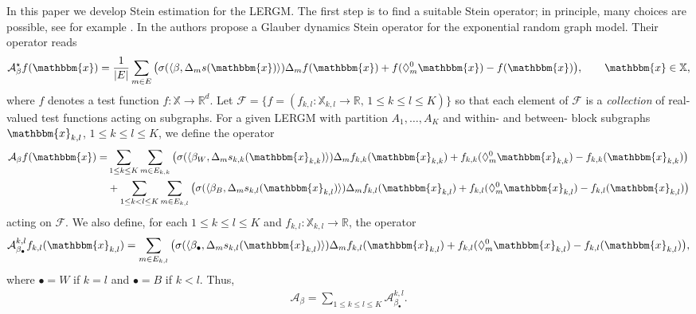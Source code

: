 \documentclass{article}
\begin{document}
In this paper we develop Stein estimation for the LERGM. The first step is to find a suitable Stein operator; in principle, many choices are possible, see for example \cite{mijoule2023stein}. In \cite{reinert2019approximating} the authors propose a Glauber dynamics Stein operator for the exponential random graph model. Their operator reads
\begin{align*} 
    \mathcal{A}_{\beta}^{\star} f(\mathbbm{x}) = \frac{1}{\vert E \vert} \sum_{m\in E}  \big( \sigma ( \langle \beta , \Delta_m s(\mathbbm{x}) \rangle )  \Delta_m  f(\mathbbm{x}) +  f(\Diamond_{m}^{0}\mathbbm{x}) - f(\mathbbm{x}) \big) , \qquad \mathbbm{x} \in \mathbb{X},
\end{align*}
where $f$ denotes a test function $f:\mathbb{X} \rightarrow \mathbb{R}^d $. Let 
$\mathcal{F} = 
\{ f=(f_{k,l}: \mathbb{X}_{k,l} \rightarrow \mathbb{R}, \, 1 \leq k \leq l \leq K)\}$ so that each element of $\mathcal{F}$ is a {\it collection} of real-valued test functions acting on subgraphs. For a given LERGM with partition $A_1, \ldots, A_K$ and within- and between-  block subgraphs $\mathbbm{x}_{k,l}$, $1 \leq k \leq l \leq K$, we define the operator
\begin{align*}
\begin{split}
    \mathcal{A}_{\beta} f(\mathbbm{x}) =  &\sum_{1 \leq k \leq K} \sum_{m\in E_{k,k}} \big( \sigma ( \langle \beta_W , \Delta_m s_{k,k}(\mathbbm{x}_{k,k}) \rangle )  \Delta_m f_{k,k}(\mathbbm{x}_{k,k}) +  f_{k,k}(\Diamond_{m}^{0}\mathbbm{x}_{k,k}) - f_{k,k}(\mathbbm{x}_{k,k})  \big) \\
     & + \sum_{1 \leq k < l \leq K} \sum_{m\in E_{k,l}} \big( \sigma ( \langle \beta_B , \Delta_m s_{k,l}(\mathbbm{x}_{k,l}) \rangle )  \Delta_m f_{k,l}(\mathbbm{x}_{k,l}) +  f_{k,l}(\Diamond_{m}^{0}\mathbbm{x}_{k,l}) - f_{k,l}(\mathbbm{x}_{k,l})   \big)
\end{split}
\end{align*}
acting on $\mathcal{F}$. We also define, for each $1 \leq k \leq l \leq K$ and 
$f_{k,l}: \mathbb{X}_{k,l} \rightarrow \mathbb{R} $, the operator 
\begin{align*}
    \mathcal{A}_{\beta_{\bullet}}^{k,l} f_{k,l}(\mathbbm{x}_{k,l}) =  \sum_{m\in E_{k,l}} \big( \sigma ( \langle \beta_{\bullet} , \Delta_m s_{k,l}(\mathbbm{x}_{k,l}) \rangle )  \Delta_m f_{k,l}(\mathbbm{x}_{k,l}) +  f_{k,l}(\Diamond_{m}^{0}\mathbbm{x}_{k,l}) - f_{k,l}(\mathbbm{x}_{k,l}) \big),
\end{align*}
where $\bullet=W$ if $k=l$ and $\bullet=B$ if $k<l$. Thus, 
\begin{align} \label{stein_operator_subgraph_sum}
    \mathcal{A}_{\beta} = \sum_{1 \leq k \leq l \leq K} \mathcal{A}_{\beta_{\bullet}}^{k,l} .
\end{align} 
\end{document}
